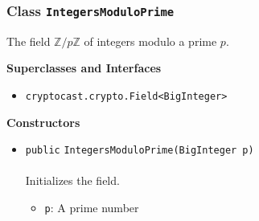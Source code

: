 \subsubsection{Class \lstinline|IntegersModuloPrime|}
The field $\mathbb{Z}/p\mathbb{Z}$ of integers modulo a prime $p$. \\
\noindent\begin{minipage}[t]{5cm}
\vspace{0.3em}
\hspace*{2em}
\vspace{0.3em}
\end{minipage}



\textbf{\sffamily Superclasses and Interfaces}
\begin{itemize}
\item \lstinline|cryptocast.crypto.Field<BigInteger>|
\end{itemize}


\textbf{\sffamily Constructors}
\begin{itemize}
\item \lstinline|public| \lstinline|IntegersModuloPrime|\lstinline|(BigInteger p)|\\ \\[-0.6em]
Initializes the field.
\begin{itemize}
\item \lstinline|p|: A prime number
\end{itemize}



\end{itemize}


